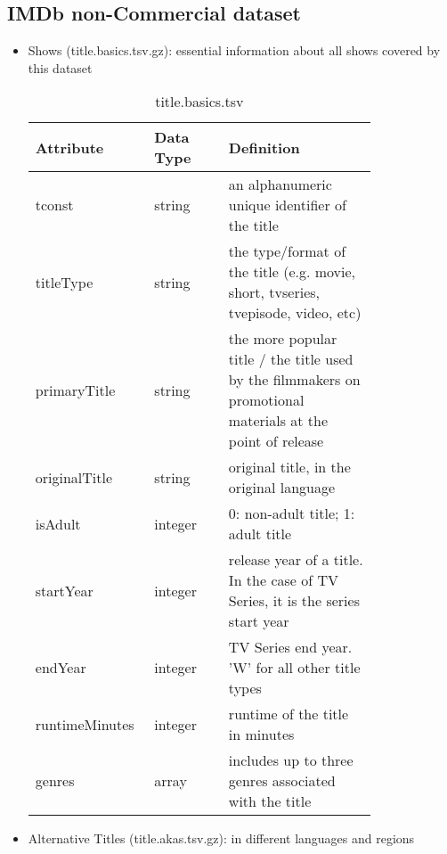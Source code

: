 \documentclass[10pt,titlepage]{article}
\begin{document}
\subsection{IMDb non-Commercial dataset}
\begin{itemize}
    \item Shows (title.basics.tsv.gz): essential information about all shows covered by this dataset

        \begin{table}[H]
            \centering
            \begin{tabular}{p{0.2\linewidth} | p{0.2\linewidth} | p{0.4\linewidth}}
                \hline
                \textbf{Attribute} & \textbf{Data Type}  & \textbf{Definition}\\
                \hline
                tconst & string & an alphanumeric unique identifier of the title \\
                \hline
                titleType & string & the type/format of the title (e.g. movie, short,  tvseries, tvepisode, video, etc) \\
                \hline
                primaryTitle & string & the more popular title / the title used by the  filmmakers on promotional
                materials at the point of  release \\
                \hline
                originalTitle & string & original title, in the original language \\
                \hline
                isAdult & integer & 0: non-adult title; 1: adult title \\
                \hline
                startYear & integer & release year of a title. In the case  of TV Series, it is the
                series start year \\
                \hline
                endYear & integer & TV Series end year. 'W' for all other title types \\
                \hline
                runtimeMinutes & integer & runtime of the title in minutes \\
                \hline
                genres & array & includes up to three genres associated with the title \\
                \hline
            \end{tabular}
            \caption{title.basics.tsv}
            \label{tab:imdb_basics}
        \end{table}

    \item Alternative Titles (title.akas.tsv.gz): in different languages and regions


\end{itemize}
\end{document}
